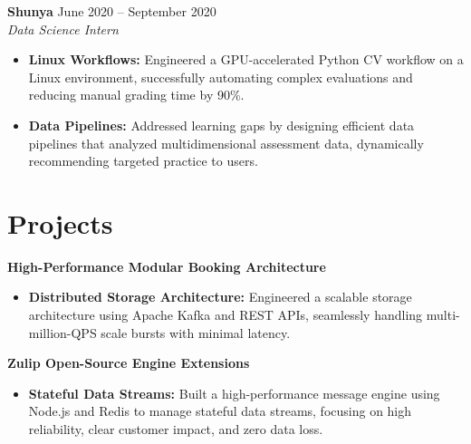 \documentclass[11pt,a4paper]{article}
\begin{document}
\vspace{3pt}
\noindent
\textbf{Shunya} \hfill June 2020 -- September 2020 \\
\textit{Data Science Intern}
\begin{itemize}[leftmargin=*,noitemsep,topsep=0pt]
    \item \textbf{Linux Workflows:} Engineered a GPU-accelerated Python CV workflow on a Linux environment, successfully automating complex evaluations and reducing manual grading time by 90\%.
    \item \textbf{Data Pipelines:} Addressed learning gaps by designing efficient data pipelines that analyzed multidimensional assessment data, dynamically recommending targeted practice to users.
\end{itemize}

\vspace{-5pt}
\section{Projects}
\noindent
\textbf{High-Performance Modular Booking Architecture}
\begin{itemize}[leftmargin=*,noitemsep,topsep=0pt]
    \item \textbf{Distributed Storage Architecture:} Engineered a scalable storage architecture using Apache Kafka and REST APIs, seamlessly handling multi-million-QPS scale bursts with minimal latency.
\end{itemize}

\vspace{3pt}
\noindent
\textbf{Zulip Open-Source Engine Extensions}
\begin{itemize}[leftmargin=*,noitemsep,topsep=0pt]
    \item \textbf{Stateful Data Streams:} Built a high-performance message engine using Node.js and Redis to manage stateful data streams, focusing on high reliability, clear customer impact, and zero data loss.
\end{itemize}
\end{document}
